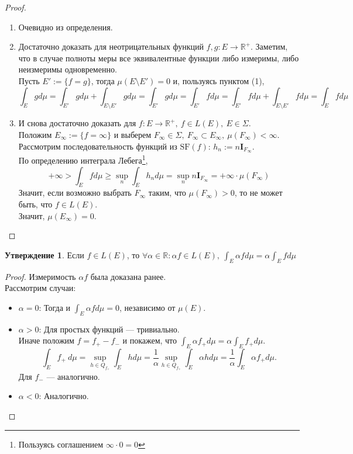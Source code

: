 \documentclass[11pt,a4paper]{report}
\def\Real{\mathbb{R}}
\theoremstyle{definition}
\theoremstyle{definition}
\newtheorem{preposition}{Утверждение}[section]
\theoremstyle{definition}
\begin{document}
		\begin{proof}$  $
			\begin{enumerate}[(1)]
				\item Очевидно из определения.
				\item Достаточно доказать для неотрицательных функций $ f, g: E \to \Real^{+} $. Заметим, что в случае полноты меры все эквивалентные функции либо измеримы, либо неизмеримы одновременно.\\
				Пусть $ E' := \{ f = g \} $, тогда $ \mu(E \setminus E') = 0 $ и, пользуясь пунктом (1),
				\[
					\int_{E} g d\mu = \int_{E'} g d\mu + \int_{E \setminus E'} g d\mu = \int_{E'} g d\mu = \int_{E'} f d\mu = \int_{E'} f d\mu + \int_{E \setminus E'} f d\mu = \int_{E} f d\mu
				\] 
				\item И снова достаточно доказать для $ f: E \to \Real^{+},\ f \in L(E),\ E \in \Sigma $.\\
				Положим $ E_{\infty} := \{ f = \infty \} $ и выберем $ F_{\infty} \in \Sigma,\ F_{\infty} \subset E_{\infty},\ \mu(F_{\infty}) < \infty $.\\
				Рассмотрим последовательность функций из $ \mbox{SF}(f) $: $ h_{n} := n \mathbf{I}_{F_{\infty}} $.\\
				По определению интеграла Лебега\footnote{Пользуясь соглашением $ \infty \cdot 0 = 0 $}, 
				\[ +\infty > \int_{E} f d\mu \ge \sup\limits_{n} \int_{E} h_{n} d\mu = \sup\limits_{n} n \mathbf{I}_{F_{\infty}} = +\infty \cdot \mu(F_{\infty}) \]
				Значит, если возможно выбрать $ F_{\infty} $ таким, что $ \mu(F_{\infty}) > 0 $, то не может быть, что $ f \in L(E) $.\\
				Значит, $ \mu(E_{\infty}) = 0 $.
			\end{enumerate}
		\end{proof}
		\begin{preposition}
			Если $ f \in L(E) $, то $ \forall \alpha \in \Real: \alpha f \in L(E),\ \int_{E} \alpha f d\mu = \alpha \int_{E} f d\mu $
		\end{preposition}
		\begin{proof}
			Измеримость $ \alpha f $ была доказана ранее.\\
			Рассмотрим случаи:
			\begin{itemize}
				\item $ \alpha = 0 $: Тогда и $ \int_{E} \alpha f d\mu = 0 $, независимо от $ \mu(E) $.
				\item $ \alpha > 0 $: Для простых функций — тривиально.\\
				Иначе положим $ f = f_{+} - f_{-} $ и покажем, что $ \int_{E} \alpha f_{+} d\mu = \alpha \int_{E} f_{+} d\mu $.\\
				\[ 
					\int_{E} f_{+}\ d\mu = \sup\limits_{h \in Q_{f_{+}}} \int_{E} h d\mu = \frac{1}{\alpha} \sup\limits_{h \in Q_{f_{+}}} \int_{E} \alpha h d\mu = \frac{1}{\alpha} \int_{E} \alpha f_{+} d\mu.
				\]
				Для $ f_{-} $ — аналогично.
				\item $ \alpha < 0 $: Аналогично. 
			\end{itemize}
		\end{proof}
\end{document}
